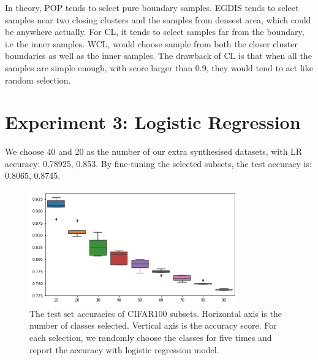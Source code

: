 In theory, POP tends to select pure boundary samples. EGDIS tends to select samples near two closing clusters and the samples from densest area, which could be anywhere actually. For CL, it tends to select samples far from the boundary, i.e the inner samples. WCL, would choose sample from both the closer cluster boundaries as well as the inner samples. The drawback of CL is that when all the samples are simple enough, with score larger than 0.9, they would tend to act like random selection.



\section{Experiment 3: Logistic Regression}
We choose 40 and 20 as the number of our extra synthesised datasets, with LR accuracy: 0.78925, 0.853. By fine-tuning the selected subsets, the test accuracy is: 0.8065, 0.8745.

 \begin{figure}[H]
 \centering
 \includegraphics[width=0.8\textwidth]{src/subsets.png}
 \caption{The test set accuracies of CIFAR100 subsets. Horizontal axis is the number of classes selected. Vertical axis is the accuracy score. For each selection, we randomly choose the classes for five times and report the accuracy with logistic regression model.}
 \label{Fig.logistic_subsets}
 \end{figure}
 
